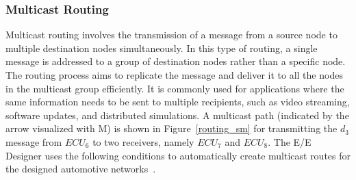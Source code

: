 	


    \subsubsection{Multicast Routing}\label{multicastrouting}

    Multicast routing involves the transmission of a message from a source node to multiple destination nodes simultaneously. In this type of routing, a single message is addressed to a group of destination nodes rather than a specific node.
    The routing process aims to replicate the message and deliver it to all the nodes in the multicast group efficiently.
    It is commonly used for applications where the same information needs to be sent to multiple recipients, such as video streaming, software updates, and distributed simulations. A multicast path (indicated by the arrow visualized with M) is shown in Figure~\ref{routing_sm} for transmitting the $d_3$ message from $ECU_6$ to two receivers, namely $ECU_7$ and $ECU_8$. The E/E Designer uses the following conditions to automatically create multicast routes for the designed automotive networks~\cite{askaripoor2023designer}.
     \newline


